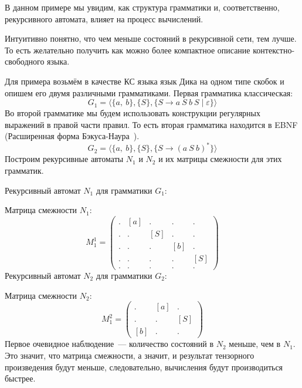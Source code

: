 \begin{example}

В данном примере мы увидим, как структура грамматики и, соответственно, рекурсивного автомата, влияет на процесс вычислений.

Интуитивно понятно, что чем меньше состояний в рекурсивной сети, тем лучше.
То есть желательно получить как можно более компактное описание контекстно-свободного языка.

Для примера возьмём в качестве КС языка язык Дика на одном типе скобок и опишем его двумя различными грамматиками.
Первая грамматика классическая:
\[
G_1 = \langle \{a,\ b\}, \{ S \}, \{S \to a \ S \ b \ S \mid \varepsilon  \} \rangle
\]
Во второй грамматике мы будем использовать конструкции регулярных выражений в правой части правил.
То есть вторая грамматика находится в EBNF (Расширенная форма Бэкуса-Наура~).
\[
G_2 = \langle \{a, \ b\}, \{S\}, \{S \to (a \ S \ b)^{*}\} \rangle
\]
Построим рекурсивные автоматы $N_1$ и $N_2$ и их матрицы смежности для этих грамматик.

Рекурсивный автомат $N_1$ для грамматики $G_1$:
\begin{center}

\end{center}

Матрица смежности $N_1$:
\[
M_1^1 =
\begin{pmatrix}
. & [a] & .   & .   & .  \\
. & .   & [S] & .   & .  \\
. & .   & .   & [b] & .  \\
. & .   & .   & .   & [S] \\
. & .   & .   & .   & .
\end{pmatrix}
\]
Рекурсивный автомат $N_2$ для грамматики $G_2$:
\begin{center}
  
\end{center}

Матрица смежности $N_2$:
\[
M_1^2 =
\begin{pmatrix}
.   & [a] & .    \\
.   & .   & [S]  \\
[b] & .   & .
\end{pmatrix}
\]
Первое очевидное наблюдение~--- количество состояний в $N_2$ меньше, чем в $N_1$.
Это значит, что матрица смежности, а значит, и результат тензорного произведения будут меньше, следовательно, вычисления будут производиться быстрее.


\end{example}
